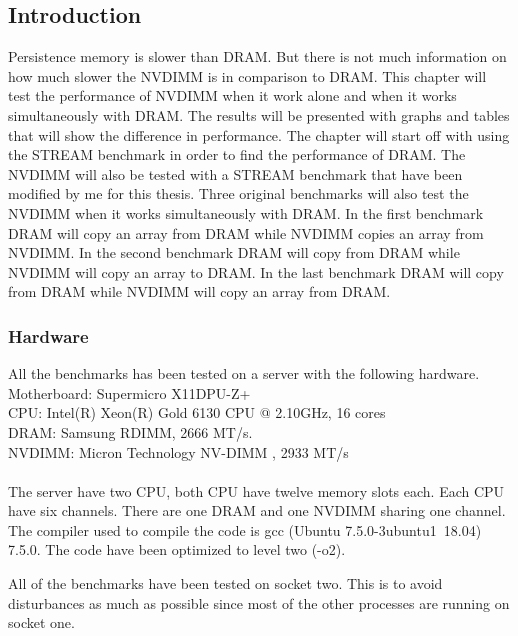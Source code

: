\documentclass[12pt,a4paper,USenglish]{article}      %
\begin{document}
\subsection{Introduction}
Persistence memory is slower than DRAM. But there is not much information on how much slower the NVDIMM is in comparison to DRAM. This chapter will test the performance of NVDIMM when it work alone and when it works simultaneously with DRAM. The results will be presented with graphs and tables that will show the difference in performance.
The chapter will start off with using the STREAM\cite{STREAM-c} benchmark in order to find the performance of DRAM.
The NVDIMM will also be tested with a STREAM benchmark that have been modified by me for this thesis. 
Three original benchmarks will also test the NVDIMM when it works simultaneously with DRAM.
In the first benchmark DRAM will copy an array from DRAM while NVDIMM copies an array from NVDIMM. 
In the second benchmark DRAM will copy from DRAM while NVDIMM will copy an array to DRAM. In the last benchmark DRAM will copy from DRAM while NVDIMM will copy an array from DRAM.

\subsubsection{Hardware}
\label{sec:hardware}
All the benchmarks has been tested on a server with the following hardware.\\
Motherboard: Supermicro X11DPU-Z+ \\
CPU: Intel(R) Xeon(R) Gold 6130 CPU @ 2.10GHz, 16 cores \\
DRAM: Samsung RDIMM, 2666 MT/s. \\
NVDIMM: Micron Technology NV-DIMM , 2933 MT/s \\
\\
The server have two CPU, both CPU have twelve memory slots each. Each CPU have six channels. There are one DRAM and one NVDIMM sharing one channel.
The compiler used to compile the code is gcc (Ubuntu 7.5.0-3ubuntu1~18.04) 7.5.0. The code have been optimized to level two (-o2).

All of the benchmarks have been tested on socket two. This is to avoid disturbances as much as possible since most of the other processes are running on socket one.
\end{document}
